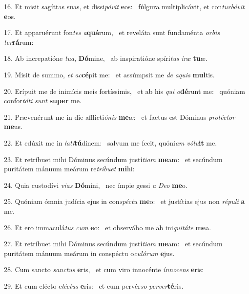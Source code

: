 16. Et misit sagíttas suas, et dissi\textit{pá}\textit{vit} \textbf{e}os: \ast\  fúlgura multiplicávit, et con\textit{tur}\textit{bá}\textit{vit} \textbf{e}os.\

17. Et apparuérunt fon\textit{tes} \textit{a}\textbf{quá}rum, \ast\  et reveláta sunt fundaménta \textit{or}\textit{bis} \textit{ter}\textbf{rá}rum:\

18. Ab increpatióne \textit{tu}\textit{a}, \textbf{Dó}mine, \ast\  ab inspiratióne spíri\textit{tus} \textit{i}\textit{ræ} \textbf{tu}æ.\

19. Misit de summo, \textit{et} \textit{ac}\textbf{cé}pit me: \ast\  et assúmpsit me \textit{de} \textit{a}\textit{quis} \textbf{mul}tis.\

20. Erípuit me de inimícis meis fortíssimis, \dag\  et ab his \textit{qui} \textit{o}\textbf{dé}runt me: \ast\  quóniam confor\textit{tá}\textit{ti} \textit{sunt} \textbf{su}\textbf{per} me.\

21. Prævenérunt me in die afflicti\textit{ó}\textit{nis} \textbf{me}æ: \ast\  et factus est Dóminus \textit{pro}\textit{téc}\textit{tor} \textbf{me}us.\

22. Et edúxit me in \textit{la}\textit{ti}\textbf{tú}dinem: \ast\  salvum me fecit, quóni\textit{am} \textit{vó}\textit{lu}\textbf{it} me.\

23. Et retríbuet mihi Dóminus secúndum justí\textit{ti}\textit{am} \textbf{me}am: \ast\  et secúndum puritátem mánuum meárum re\textit{trí}\textit{bu}\textit{et} \textbf{mi}hi:\

24. Quia custodívi \textit{vi}\textit{as} \textbf{Dó}mini, \ast\  nec ímpie gessi \textit{a} \textit{De}\textit{o} \textbf{me}o.\

25. Quóniam ómnia judícia ejus in con\textit{spéc}\textit{tu} \textbf{me}o: \ast\  et justítias ejus non \textit{ré}\textit{pu}\textit{li} \textbf{a} me.\

26. Et ero immaculá\textit{tus} \textit{cum} \textbf{e}o: \ast\  et observábo me ab ini\textit{qui}\textit{tá}\textit{te} \textbf{me}a.\

27. Et retríbuet mihi Dóminus secúndum justí\textit{ti}\textit{am} \textbf{me}am: \ast\  et secúndum puritátem mánuum meárum in conspéctu o\textit{cu}\textit{ló}\textit{rum} \textbf{e}jus.\

28. Cum sancto \textit{sanc}\textit{tus} \textbf{e}ris, \ast\  et cum viro innocénte \textit{ín}\textit{no}\textit{cens} \textbf{e}ris:\

29. Et cum elécto e\textit{léc}\textit{tus} \textbf{e}ris: \ast\  et cum pervér\textit{so} \textit{per}\textit{ver}\textbf{té}ris.\

